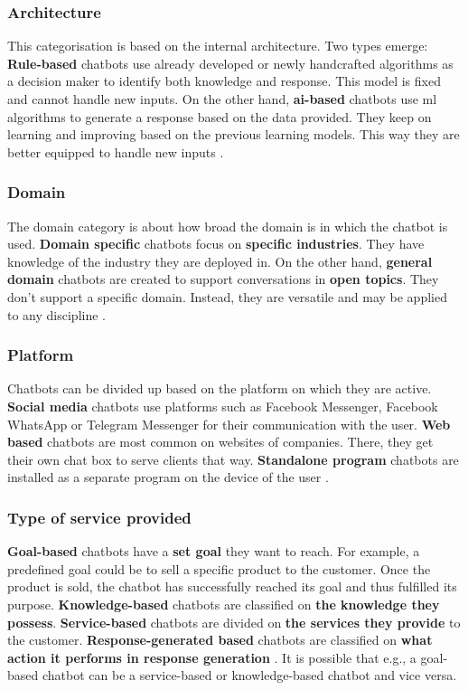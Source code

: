 \subsubsection{Architecture}
This categorisation is based on the internal architecture. Two types emerge: \textbf{Rule-based} chatbots use already developed or newly handcrafted algorithms as a decision maker to identify both knowledge and response. This model is fixed and cannot handle new inputs. On the other hand, \textbf{\acrshort{ai}-based} chatbots use \acrlong{ml} algorithms to generate a response based on the data provided. They keep on learning and improving based on the previous learning models. This way they are better equipped to handle new inputs \citep{Maroengsit2019}.

\subsubsection{Domain}
The domain category is about how broad the domain is in which the chatbot is used. \textbf{Domain specific} chatbots focus on \textbf{specific industries}. They have knowledge of the industry they are deployed in. On the other hand, \textbf{general domain} chatbots are created to support conversations in \textbf{open topics}. They don’t support a specific domain. Instead, they are versatile and may be applied to any discipline \citep{Maroengsit2019}.

\subsubsection{Platform}
Chatbots can be divided up based on the platform on which they are active. \textbf{Social media} chatbots use platforms such as Facebook Messenger, Facebook WhatsApp or Telegram Messenger for their communication with the user. \textbf{Web based} chatbots are most common on websites of companies. There, they get their own chat box to serve clients that way. \textbf{Standalone program} chatbots are installed as a separate program on the device of the user \citep*{Maroengsit2019, Xu2017, CICBA2018}.

\subsubsection{Type of service provided}
\textbf{Goal-based} chatbots have a \textbf{set goal} they want to reach. For example, a predefined goal could be to sell a specific product to the customer. Once the product is sold, the chatbot has successfully reached its goal and thus fulfilled its purpose. \textbf{Knowledge-based} chatbots are classified on \textbf{the knowledge they possess}. \textbf{Service-based} chatbots are divided on \textbf{the services they provide} to the customer. \textbf{Response-generated based} chatbots are classified on \textbf{what action it performs in response generation} \citep{Nuruzzaman2018}. It is possible that e.g., a goal-based chatbot can be a service-based or knowledge-based chatbot and vice versa.

